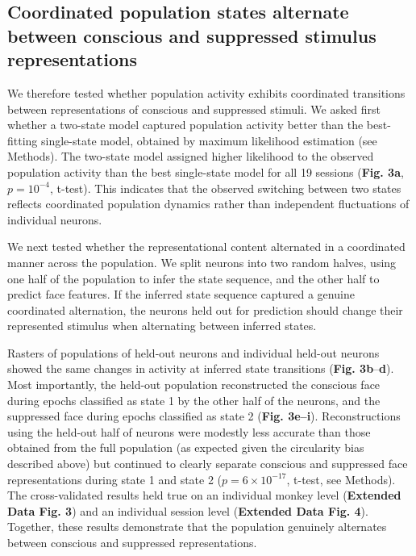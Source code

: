 \documentclass{article}
\begin{document}
\subsection*{Coordinated population states alternate between conscious and suppressed stimulus representations}

We therefore tested whether population activity exhibits coordinated transitions between representations of conscious and suppressed stimuli. We asked first whether a two-state model captured population activity better than the best-fitting single-state model, obtained by maximum likelihood estimation (see Methods). The two-state model assigned higher likelihood to the observed population activity than the best single-state model for all 19 sessions (\textbf{Fig. 3a}, $p = 10^{-4}$, t-test). This indicates that the observed switching between two states reflects coordinated population dynamics rather than independent fluctuations of individual neurons.

We next tested whether the representational content alternated in a coordinated manner across the population. We split neurons into two random halves, using one half of the population to infer the state sequence, and the other half to predict face features. If the inferred state sequence captured a genuine coordinated alternation, the neurons held out for prediction should change their represented stimulus when alternating between inferred states.

Rasters of populations of held-out neurons and individual held-out neurons showed the same changes in activity at inferred state transitions (\textbf{Fig. 3b}--\textbf{d}). Most importantly, the held-out population reconstructed the conscious face during epochs classified as state 1 by the other half of the neurons, and the suppressed face during epochs classified as state 2 (\textbf{Fig. 3e--i}). Reconstructions using the held-out half of neurons were modestly less accurate than those obtained from the full population (as expected given the circularity bias described above) but continued to clearly separate conscious and suppressed face representations during state 1 and state 2 ($p = 6 \times 10^{-17}$, t-test, see Methods). The cross-validated results held true on an individual monkey level (\textbf{Extended Data Fig. 3}) and an individual session level (\textbf{Extended Data Fig. 4}). Together, these results demonstrate that the population genuinely alternates between conscious and suppressed representations.
\end{document}

